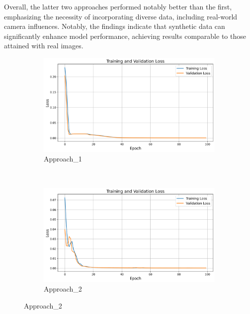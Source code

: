\documentclass[12pt,DIV14,BCOR12mm,a4paper,footinclude=false,headinclude,parskip=half-,twoside,openright,cleardoublepage=empty,toc=index,bibliography=totoc,listof=totoc]{scrreprt}
\numberwithin{equation}{chapter}
\begin{document}
Overall, the latter two approaches performed notably better than the first, emphasizing the necessity of incorporating diverse data, including real-world camera influences. Notably, the findings indicate that synthetic data can significantly enhance model performance, achieving results comparable to those attained with real images.

\begin{figure}
    \centering
    \begin{subfigure}[b]{0.7\textwidth} %
        \centering
        \includegraphics[width=\textwidth]{../media/training_validation_loss_approach_1.png}
        \caption{Approach\_1}
        \label{fig:approach1}
    \end{subfigure}
    \\ %
    \begin{subfigure}[b]{0.7\textwidth} %
        \centering
        \includegraphics[width=\textwidth]{../media/training_validation_loss_approach_2.PNG}
        \caption{Approach\_2}
        \label{fig:approach2}
    \end{subfigure}

\end{figure}
\end{document}

